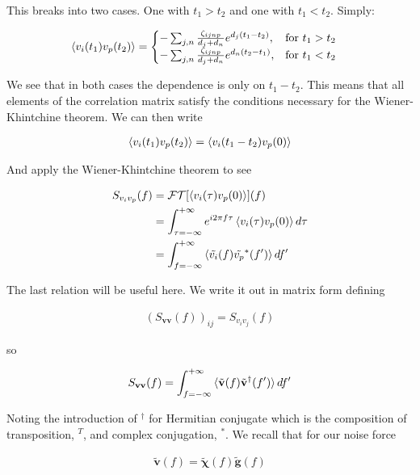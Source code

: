 \documentclass[12pt]{article}
\newcommand{\bv}[1]{\mathbf{#1}}
\begin{document}
This breaks into two cases. One with $t_1>t_2$ and one with $t_1<t_2$. Simply:

\begin{align}
\braket{v_i(t_1)v_p(t_2)}&=
\begin{cases}
-\sum_{j,n} \frac{\zeta_{ijnp}}{d_j+d_n} e^{d_j (t_1-t_2)}, & \text{for } t_1>t_2\\
-\sum_{j,n} \frac{\zeta_{ijnp}}{d_j+d_n} e^{d_n (t_2-t_1)}, & \text{for } t_1<t_2
\end{cases}
\end{align}

We see that in both cases the dependence is only on $t_1-t_2$. This means that all elements of the correlation matrix satisfy the conditions necessary for the Wiener-Khintchine theorem. We can then write

\begin{align}
\braket{v_i(t_1)v_p(t_2)} = \braket{v_i(t_1-t_2)v_p(0)}
\end{align}

And apply the Wiener-Khintchine theorem to see

\begin{align}
S_{v_i v_p}(f) &= \mathcal{FT}[\braket{v_i(\tau)v_p(0)}](f)\\
& = \int_{\tau=-\infty}^{+\infty} e^{i2\pi f \tau} \braket{v_i(\tau)v_p(0)} d\tau\\ 
&= \int_{f=-\infty}^{+\infty} \braket{\tilde{v_i}(f) \tilde{v_p}^*(f')} df' 
\end{align}

The last relation will be useful here. We write it out in matrix form defining

\begin{align}
(S_{\bv{v}\bv{v}}(f))_{ij} = S_{v_i v_j}(f)
\end{align}

so

\begin{align}
S_{\bv{v}\bv{v}}(f) = \int_{f=-\infty}^{+\infty} \braket{\tilde{\bv{v}}(f)\tilde{\bv{v}}^{\dag}(f')} df'
\end{align}

Noting the introduction of $^{\dag}$ for Hermitian conjugate which is the composition of transposition, $^T$, and complex conjugation, $^*$.
We recall that for our noise force

\begin{align}
\tilde{\bv{v}}(f) = \tilde{\boldsymbol{\chi}}(f)\tilde{\bv{g}}(f)
\end{align}
\end{document}
